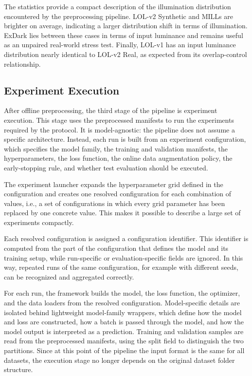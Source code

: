 

The statistics provide a compact description of the illumination distribution encountered by the preprocessing pipeline. LOL-v2 Synthetic and MILLs are brighter on average, indicating a larger distribution shift in terms of illumination. ExDark lies between these cases in terms of input luminance and remains useful as an unpaired real-world stress test. Finally, LOL-v1 has an input luminance distribution nearly identical to LOL-v2 Real, as expected from its overlap-control relationship.

\subsection{Experiment Execution}
\label{sec:experiment_execution}

After offline preprocessing, the third stage of the pipeline is experiment execution. This stage uses the preprocessed manifests to run the experiments required by the protocol. It is model-agnostic: the pipeline does not assume a specific architecture. Instead, each run is built from an experiment configuration, which specifies the model family, the training and validation manifests, the hyperparameters, the loss function, the online data augmentation policy, the early-stopping rule, and whether test evaluation should be executed.

The experiment launcher expands the hyperparameter grid defined in the configuration and creates one resolved configuration for each combination of values, i.e., a set of configurations in which every grid parameter has been replaced by one concrete value. This makes it possible to describe a large set of experiments compactly.

Each resolved configuration is assigned a configuration identifier. This identifier is computed from the part of the configuration that defines the model and its training setup, while run-specific or evaluation-specific fields are ignored. In this way, repeated runs of the same configuration, for example with different seeds, can be recognized and aggregated correctly.

For each run, the framework builds the model, the loss function, the optimizer, and the data loaders from the resolved configuration. Model-specific details are isolated behind lightweight model-family wrappers, which define how the model and loss are constructed, how a batch is passed through the model, and how the model output is interpreted as a prediction. Training and validation samples are read from the preprocessed manifests, using the split field to distinguish the two partitions. Since at this point of the pipeline the input format is the same for all datasets, the execution stage no longer depends on the original dataset folder structure.

